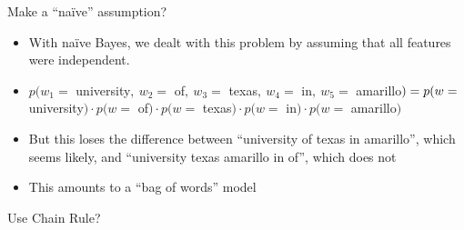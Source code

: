 \documentclass[11pt,letterpaper]{article}
\begin{document}
Make a ``na\"{i}ve'' assumption?

\begin{itemize}
  \item With na\"{i}ve Bayes, we dealt with this problem by assuming that all features were independent.
  \item $p(w_1=$ university$, ~ w_2=$ of$, ~ w_3=$ texas$, ~ w_4=$ in$, ~ w_5=$ amarillo$) = \vspace{1mm} \\
         p(w=$ university$) \cdot p(w=$ of$) \cdot p(w=$ texas$) \cdot p(w=$ in$) \cdot p(w=$ amarillo$)$
  \item But this loses the difference between ``university of texas in amarillo'', which seems likely, and ``university texas amarillo in of'', which does not
  \item This amounts to a ``bag of words'' model
\end{itemize}

Use Chain Rule?
\end{document}
